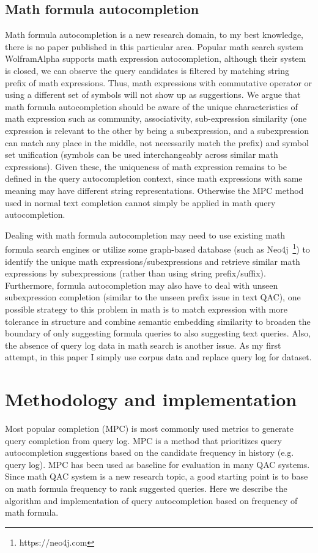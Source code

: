 \documentclass[12pt]{article} %
\begin{document}
\subsection{Math formula autocompletion}
Math formula autocompletion is a new research domain, to my best knowledge, there is no paper published in this particular area. 
Popular math search system WolframAlpha supports math expression autocompletion, although their system is closed, we can observe the query candidates is filtered by matching string prefix of math expressions. 
Thus, math expressions with commutative operator or using a different set of symbols will not show up as suggestions.
We argue that math formula autocompletion should be aware of the unique characteristics of math expression such as community, associativity, sub-expression similarity (one expression is relevant to the other by being a subexpression, and a subexpression can match any place in the middle, not necessarily match the prefix) and symbol set unification (symbols can be used interchangeably across similar math expressions).
Given these, the uniqueness of math expression remains to be defined in the query autocompletion context, since math expressions with same meaning may have different string representations. Otherwise the MPC method used in normal text completion cannot simply be applied in math query autocompletion.

Dealing with math formula autocompletion may need to use existing math formula search engines or utilize some graph-based database (such as Neo4j~\footnote{https://neo4j.com}) to identify the unique math expressions/subexpressions and retrieve similar math expressions by subexpressions (rather than using string prefix/suffix).
Furthermore, formula autocompletion may also have to deal with unseen subexpression completion (similar to the unseen prefix issue in text QAC), one possible strategy to this problem in math is to match  expression with more tolerance in structure and combine semantic embedding similarity to broaden the boundary of only suggesting formula queries to also suggesting text queries.
Also, the absence of query log data in math search is another issue.
As my first attempt, in this paper I simply use corpus data and replace query log for dataset.

\section{Methodology and implementation}
Most popular completion (MPC) is most commonly used metrics to generate query completion from query
log.
MPC is a method that prioritizes query autocompletion suggestions based on the candidate frequency in history (e.g. query log).
MPC has been used as baseline for evaluation in many QAC systems.
Since math QAC system is a new research topic, a good starting point is to base on math formula frequency to rank suggested queries.
Here we describe the algorithm and implementation of query autocompletion based on frequency of math formula.
\end{document}
